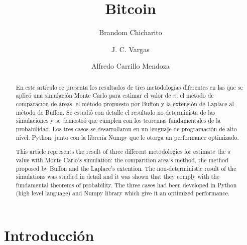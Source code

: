 \documentclass{rbf}
\begin{document}
        
\title{Bitcoin}

\author{Brandom Chicharito\marca{*}}
%

\author{J. C. Vargas\marca{\dag}}
 
\author{Alfredo Carrillo Mendoza\marca{\ddag}}

\begin{abstract}
\Resumen
En este artículo se presenta los resultados de tres metodologías diferentes en las que se aplicó una simulación Monte Carlo para estimar el valor de $\pi$: el método de comparación de áreas, el método propuesto por Buffon y la extensión de Laplace al método de Buffon. Se estudió con detalle el resultado no determinista de las simulaciones y se demostró que cumplen con los teoremas fundamentales de la probabilidad. Los tres casos se desarrollaron en un lenguaje de programación de alto nivel: Python, junto con la librería Numpy que le otorga un performance optimizado.



\Abstract
This article represents the result of three different metodologies for estimate the $\pi$ value with Monte Carlo's simulation: the comparition area's method, the method proposed by Buffon and the Laplace's extention. The non-deterministic result of the simulations was studied in detail and it was shown that they comply with the fundamental theorems of probability. The three cases had been developed in  Python (high level language) and Numpy library which give it an optimized performance. 

\end{abstract}

\maketitle




\section{Introducción}
\end{document}
